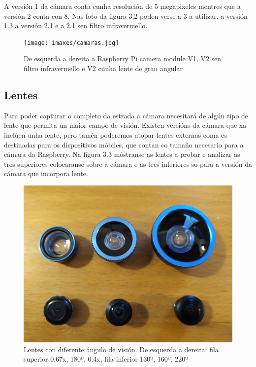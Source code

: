 A versión 1 da cámara conta cunha resolución de 5 megapixeles mentres que a versión 2 conta con 8. Nas foto da figura 3.2 poden verse a 3 a utilizar, a versión 1.3 a versión 2.1 e a 2.1 sen filtro infravermello.
\begin{figure}[tb]
  \centering
  \texttt{[image: imaxes/camaras.jpg]}
  \caption{De esquerda a dereita a Raspberry Pi camera module V1, V2 sen filtro infravermello e V2 cunha lente de gran angular}
  \label{f:Cámaras}
\end{figure}
\subsection{Lentes}
Para poder capturar o completo da estrada a cámara necesitará de algún tipo de lente que permita un maior campo de visión. Existen versións da cámara que xa inclúen unha lente, pero tamén poderemos atopar lentes externas coma es destinadas para os dispositivos móbiles, que contan co tamaño necesario para a cámara da Raspberry. Na figura 3.3 móstranse as lentes a probar e analizar as tres superiores colocaranse sobre a cámara e as tres inferiores so para a versión da cámara que incorpora lente.
\begin{figure}[tb]
  \centering
  \includegraphics[scale=.06]{imaxes/lentes.jpg}
  \caption{Lentes con diferente ángulo de visión. De esquerda a dereita: fila superior 0.67x, 180º, 0.4x, fila inferior 130º, 160º, 220º }
  \label{f:Lentes}
\end{figure}

